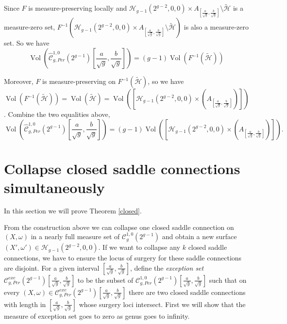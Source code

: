 \documentclass[12pt]{amsart} %
\newtheorem{proposition}[theorem]{Proposition}
\theoremstyle{definition}
\theoremstyle{remark}
\numberwithin{equation}{section}
\renewcommand\H{{\mathcal H}}
\newcommand{\V}{\operatorname{Vol}}
\begin{document}
Since $F$ is measure-preserving locally and $\H_{g-1}(2^{g-2},0,0)\times A_{[\frac{a}{\sqrt{g}},\frac{b}{\sqrt{g}}]}\setminus \tilde{\H}$ is a measure-zero set,
$F^{-1}(\H_{g-1}(2^{g-2},0,0)\times A_{[\frac{a}{\sqrt{g}},\frac{b}{\sqrt{g}}]}\setminus \tilde{\H})$ is also a measure-zero set.
So we have
$$\V(\hat{\mathcal{C}}^{1,0}_{g,Per}(2^{g-1})[\frac{a}{\sqrt{g}},\frac{b}{\sqrt{g}}])=(g-1)\V(F^{-1}(\tilde{\H}))$$

Moreover, $F$ is measure-preserving on $F^{-1}(\tilde{\H})$, so we have
$$\V(F^{-1}(\tilde{\H}))=\V(\tilde{\H})=\V([\H_{g-1}(2^{g-2},0,0)\times (A_{[\frac{a}{\sqrt{g}},\frac{b}{\sqrt{g}}]})])$$.
Combine the two equalities above, 
$$\V(\hat{\mathcal{C}}^{1,0}_{g,Per}(2^{g-1})[\frac{a}{\sqrt{g}},\frac{b}{\sqrt{g}}])=(g-1)\V([\H_{g-1}(2^{g-2},0,0)\times (A_{[\frac{a}{\sqrt{g}},\frac{b}{\sqrt{g}}]})]).$$




\section{Collapse closed saddle connections simultaneously}
In this section we will prove Theorem \ref{closed}.


From the construction above we can collapse one closed saddle connection on $(X,\omega)$ in a nearly full measure set of $\mathcal{C}^{1,0}_{g}(2^{g-1})$ and obtain a new surface
$(X',\omega')\in \H_{g-1}(2^{g-2},0,0)$. If we want to collapse any $k$ closed saddle connections, 
we have to ensure the locus of surgery for these saddle connections are disjoint.
For a given interval $[\frac{a}{\sqrt{g}},\frac{b}{\sqrt{g}}]$,
define the \emph{exception set} $\mathcal{C}^{exc}_{g,Per}(2^{g-1})[\frac{a}{\sqrt{g}},\frac{b}{\sqrt{g}}]$ to be the subset of 
$\mathcal{C}^{1,0}_{g,Per}(2^{g-1})[\frac{a}{\sqrt{g}},\frac{b}{\sqrt{g}}]$ 
such that on every $(X,\omega)\in \mathcal{C}^{exc}_{g,Per}(2^{g-1})[\frac{a}{\sqrt{g}},\frac{b}{\sqrt{g}}]$ there are two closed saddle connections with length in
$[\frac{a}{\sqrt{g}},\frac{b}{\sqrt{g}}]$ whose surgery loci intersect.
First we will show that the measure of exception set goes to zero as genus goes to infinity.
\end{document}
